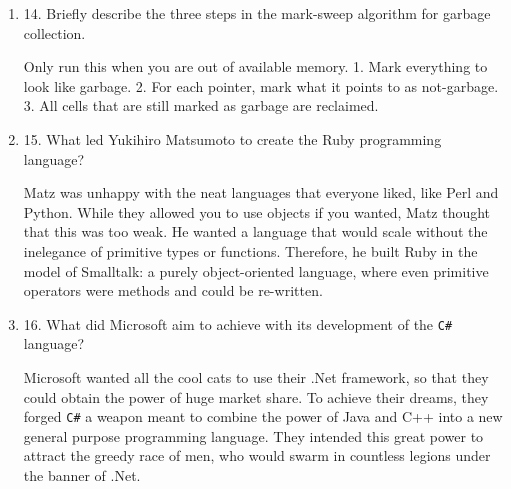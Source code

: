 \begin{enumerate}
\begin{answer}
    \end{answer}

  \item 14. Briefly describe the three steps in the mark-sweep algorithm
    for garbage collection.

  \begin{answer}

    Only run this when you are out of available memory.
    1. Mark everything to look like garbage.
    2. For each pointer, mark what it points to as not-garbage.
    3. All cells that are still marked as garbage are reclaimed. 

    \end{answer}

  \item 15. What led Yukihiro Matsumoto to create the Ruby programming language?

  \begin{answer}

    Matz was unhappy with the neat languages that everyone liked, like
    Perl and Python. While they allowed you to use objects if you
    wanted, Matz thought that this was too weak. He wanted a language
    that would scale without the inelegance of primitive types or
    functions. Therefore, he built Ruby in the model of Smalltalk: a
    purely object-oriented language, where even primitive operators
    were methods and could be re-written.

    \end{answer}

  \item 16. What did Microsoft aim to achieve with its development of the
    \verb+C#+ language?

  \begin{answer}

    Microsoft wanted all the cool cats to use their .Net framework, so
    that they could obtain the power of huge market share. To achieve
    their dreams, they forged \verb+C#+ a weapon meant to combine the
    power of Java and C++ into a new general purpose programming
    language. They intended this great power to attract the greedy
    race of men, who would swarm in countless legions under the banner
    of .Net.

    \end{answer}

  \end{enumerate}



